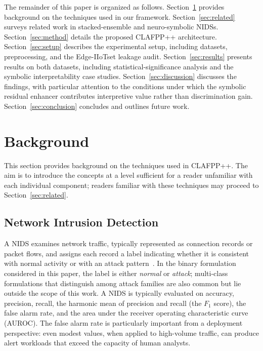 \documentclass[pdflatex,sn-mathphys-num]{sn-jnl}
\theoremstyle{thmstyleone}
\theoremstyle{thmstyletwo}
\theoremstyle{thmstylethree}
\begin{document}
The remainder of this paper is organized as follows. Section~\ref{sec:background} provides background on the techniques used in our framework. Section~\ref{sec:related} surveys related work in stacked-ensemble and neuro-symbolic NIDSs. Section~\ref{sec:method} details the proposed CLAFPP++ architecture. Section~\ref{sec:setup} describes the experimental setup, including datasets, preprocessing, and the Edge-IIoTset leakage audit. Section~\ref{sec:results} presents results on both datasets, including statistical-significance analysis and the symbolic interpretability case studies. Section~\ref{sec:discussion} discusses the findings, with particular attention to the conditions under which the symbolic residual enhancer contributes interpretive value rather than discrimination gain. Section~\ref{sec:conclusion} concludes and outlines future work.

\section{Background}\label{sec:background}

This section provides background on the techniques used in CLAFPP++. The aim is to introduce the concepts at a level sufficient for a reader unfamiliar with each individual component; readers familiar with these techniques may proceed to Section~\ref{sec:related}.

\subsection{Network Intrusion Detection}
A NIDS examines network traffic, typically represented as connection records or packet flows, and assigns each record a label indicating whether it is consistent with normal activity or with an attack pattern~\cite{shone2017deep,tavallaee2009detailed}. In the binary formulation considered in this paper, the label is either \emph{normal} or \emph{attack}; multi-class formulations that distinguish among attack families are also common but lie outside the scope of this work. A NIDS is typically evaluated on accuracy, precision, recall, the harmonic mean of precision and recall (the $F_1$ score), the false alarm rate, and the area under the receiver operating characteristic curve (AUROC). The false alarm rate is particularly important from a deployment perspective: even modest values, when applied to high-volume traffic, can produce alert workloads that exceed the capacity of human analysts.
\end{document}
